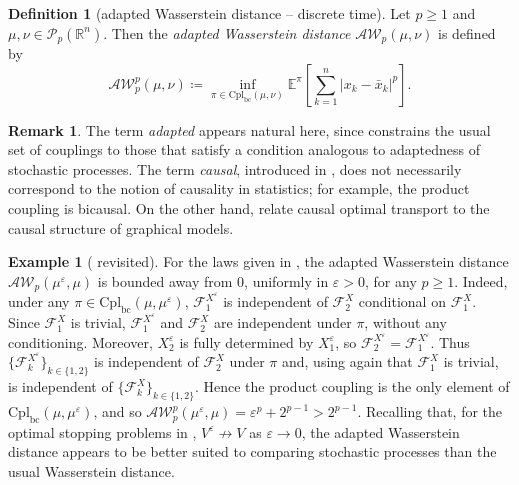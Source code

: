 \documentclass[onseside, final]{amsart}
\theoremstyle{definition}
\newtheorem{definition}[theorem]{Definition}
\newtheorem{example}[theorem]{Example}
\newtheorem{remark}[theorem]{Remark}
\newcommand{\F}{\mathcal F}
\newcommand{\Pc}{\mathcal P}
\newcommand{\R}{\mathbb R}
\newcommand{\E}{\mathbb E}
\newcommand{\AW}{\mathcal A\mathcal W}
\newcommand{\cpl}{\mathrm{Cpl}}
\newcommand{\cplba}{\cpl_{\mathrm{bc}}}
\numberwithin{equation}{section}
\begin{document}
			\begin{definition}[adapted Wasserstein distance -- discrete time]\label{def:disc-aw}
				Let $p \geq 1$ and $\mu, \nu \in \Pc_p(\R^n)$. Then the \emph{adapted Wasserstein distance} $\AW_p(\mu, \nu)$ is defined by
				\begin{equation}
					\AW_p^p(\mu, \nu) \coloneqq \inf_{\pi \in \cplba(\mu, \nu)}\E^\pi\!\left[\sum_{k = 1}^n|x_k - \bar x_k|^p\right]\!.
				\end{equation}
			\end{definition}
			
			\begin{remark}
			The term \emph{adapted} appears natural here, since  constrains the usual set of couplings to those that satisfy a condition analogous to adaptedness of stochastic processes. The term \emph{causal}, introduced in \citep{La18}, does not necessarily correspond to the notion of causality in statistics; for example, the product coupling is bicausal. On the other hand, \citet{ChEc23} relate causal optimal transport to the causal structure of graphical models.
			\end{remark}
			
			\begin{example}[ revisited]\label{ex:revisited}
				For the laws given in , the adapted Wasserstein distance $\AW_p(\mu^\varepsilon, \mu)$ is bounded away from $0$, uniformly in $\varepsilon > 0$, for any $p \geq 1$. Indeed, under any $\pi \in \cplba(\mu, \mu^\varepsilon)$, $\F^{X^\varepsilon}_1$ is independent of $\F^{X}_2$ conditional on $\F^{X}_1$. Since $\F^{X}_1$ is trivial, $\F^{X^\varepsilon}_1$ and $\F^{X}_2$ are independent under $\pi$, without any conditioning. Moreover, $X^\varepsilon_2$ is fully determined by $X^\varepsilon_1$, so $\F^{X^\varepsilon}_2 = \F^{X^\varepsilon}_1$. Thus $\{\F^{X^\varepsilon}_k\}_{k \in \{1, 2\}}$ is independent of $\F^X_2$ under $\pi$ and, using again that $\F^X_1$ is trivial, is independent of $\{\F^{X}_k\}_{k \in \{1, 2\}}$. Hence the product coupling is the only element of $\cplba(\mu, \mu^\varepsilon)$, and so $\AW_p^p(\mu^\varepsilon, \mu)  = \varepsilon^p + 2^{p-1} > 2^{p-1}$.
				Recalling that, for the optimal stopping problems in , $V^\varepsilon \not \to V$ as $\varepsilon \to 0$, the adapted Wasserstein distance appears to be better suited to comparing stochastic processes than the usual Wasserstein distance.
			\end{example}
			
\end{document}
